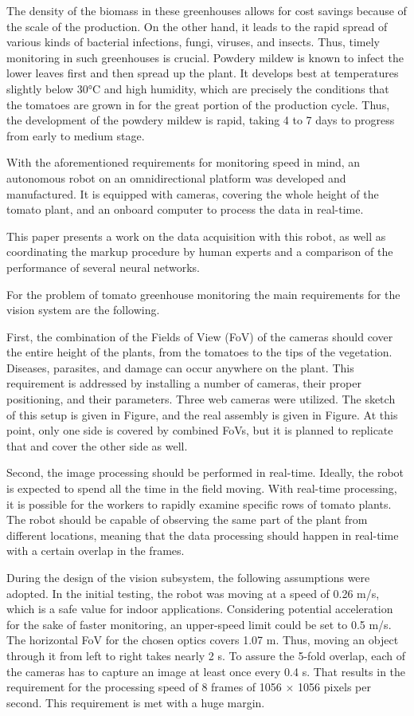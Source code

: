 The density of the biomass in these greenhouses allows for cost savings because of the scale of the production. 
On the other hand, it leads to the rapid spread of various kinds of bacterial infections, fungi, viruses, and insects. Thus, timely monitoring in such greenhouses is crucial.
Powdery mildew is known to infect the lower leaves first and then spread up the plant.
It develops best at temperatures slightly below 30\si{\celsius} and high humidity, which are precisely the conditions that the tomatoes are grown in for the great portion of the production cycle.
Thus, the development of the powdery mildew is rapid, taking 4 to 7 days to progress from early to medium stage.

With the aforementioned requirements for monitoring speed in mind, an autonomous robot on an omnidirectional platform was developed and manufactured.
It is equipped with cameras, covering the whole height of the tomato plant, and an onboard computer to process the data in real-time.

This paper presents a work on the data acquisition with this robot, as well as coordinating the markup procedure by human experts and a comparison of the performance of several neural networks.

For the problem of tomato greenhouse monitoring the main requirements for the vision system are the following.

First, the combination of the Fields of View (FoV) of the cameras should cover the entire height of the plants, from the tomatoes to the tips of the vegetation.
Diseases, parasites, and damage can occur anywhere on the plant.
This requirement is addressed by installing a number of cameras, their proper positioning, and their parameters.
Three web cameras were utilized.
The sketch of this setup is given in Figure, and the real assembly is given in Figure.
At this point, only one side is covered by combined FoVs, but it is planned to replicate that and cover the other side as well.

Second, the image processing should be performed in real-time. 
Ideally, the robot is expected to spend all the time in the field moving. 
With real-time processing, it is possible for the workers to rapidly examine specific rows of tomato plants.
The robot should be capable of observing the same part of the plant from different locations, meaning that the data processing should happen in real-time with a certain overlap in the frames.

During the design of the vision subsystem, the following assumptions were adopted.
In the initial testing, the robot was moving at a speed of 0.26 \si{m/s}, which is a safe value for indoor applications.
Considering potential acceleration for the sake of faster monitoring, an upper-speed limit could be set to 0.5 m/s.
The horizontal FoV for the chosen optics covers 1.07 m.
Thus, moving an object through it from left to right takes nearly 2 s.
To assure the 5-fold overlap, each of the cameras has to capture an image at least once every 0.4 s.
That results in the requirement for the processing speed of 8 frames of 1056 $\times$ 1056 pixels per second.
This requirement is met with a huge margin.

